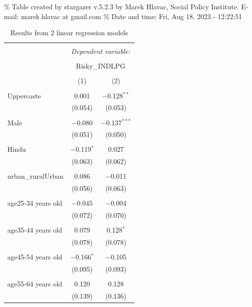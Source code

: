 \documentclass[
]{article}
\begin{document}
\begingroup\setlength{\tabcolsep}{1pt}

\renewcommand{\arraystretch}{0.7}

\% Table created by stargazer v.5.2.3 by Marek Hlavac, Social Policy
Institute. E-mail: marek.hlavac at gmail.com \% Date and time: Fri, Aug
18, 2023 - 12:22:51

\begin{table}[!htbp] \centering 
  \caption{Results from 2 linear regression models} 
  \label{} 
\begin{tabular}{@{\extracolsep{5pt}}lcc} 
\\[-1.8ex]\hline 
\hline \\[-1.8ex] 
 & \multicolumn{2}{c}{\textit{Dependent variable:}} \\ 
\cline{2-3} 
\\[-1.8ex] & \multicolumn{2}{c}{Risky\_INDLPG} \\ 
\\[-1.8ex] & (1) & (2)\\ 
\hline \\[-1.8ex] 
 Uppercaste & 0.001 & $-$0.128$^{**}$ \\ 
  & (0.054) & (0.053) \\ 
  & & \\ 
 Male & $-$0.080 & $-$0.137$^{***}$ \\ 
  & (0.051) & (0.050) \\ 
  & & \\ 
 Hindu & $-$0.119$^{*}$ & 0.027 \\ 
  & (0.063) & (0.062) \\ 
  & & \\ 
 urban\_ruralUrban & 0.086 & $-$0.011 \\ 
  & (0.056) & (0.063) \\ 
  & & \\ 
 age25-34 years old & $-$0.045 & $-$0.004 \\ 
  & (0.072) & (0.070) \\ 
  & & \\ 
 age35-44 years old & 0.079 & 0.128$^{*}$ \\ 
  & (0.078) & (0.078) \\ 
  & & \\ 
 age45-54 years old & $-$0.166$^{*}$ & $-$0.105 \\ 
  & (0.095) & (0.093) \\ 
  & & \\ 
 age55-64 years old & 0.120 & 0.128 \\ 
  & (0.139) & (0.136) \\ 

\end{tabular}
\end{table}
\end{document}
